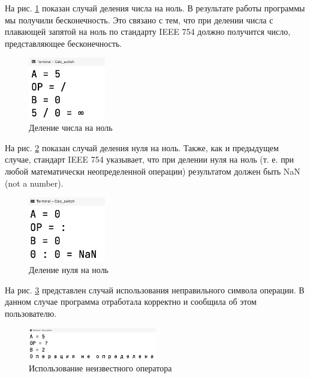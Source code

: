 \documentclass[a4paper,14pt]{extarticle}
\numberwithin{figure}{section}
\begin{document}
На рис. \ref{fig:task-2-2} показан случай деления числа на ноль. В результате работы программы мы получили бесконечность. Это связано с тем, что при делении числа с плавающей запятой на ноль по стандарту IEEE 754 должно получится число, представляющее бесконечность.

\begin{figure}[H]
    \centering
    \includegraphics[width=0.3\textwidth]{images/task-2-2.png}
    \caption{Деление числа на ноль}
    \label{fig:task-2-2}
\end{figure}

На рис. \ref{fig:task-2-3} показан случай деления нуля на ноль. Также, как и предыдущем случае, стандарт IEEE 754 указывает, что при делении нуля на ноль (т. е. при любой математически неопределенной операции) результатом должен быть NaN (not a number).

\begin{figure}[H]
    \centering
    \includegraphics[width=0.3\textwidth]{images/task-2-3.png}
    \caption{Деление нуля на ноль}
    \label{fig:task-2-3}
\end{figure}

На рис. \ref{fig:task-2-4} представлен случай использования неправильного символа операции. В данном случае программа отработала корректно и сообщила об этом пользователю.

\begin{figure}[H]
    \centering
    \includegraphics[width=0.5\textwidth]{images/task-2-4.png}
    \caption{Использование неизвестного оператора}
    \label{fig:task-2-4}
\end{figure}
\end{document}
